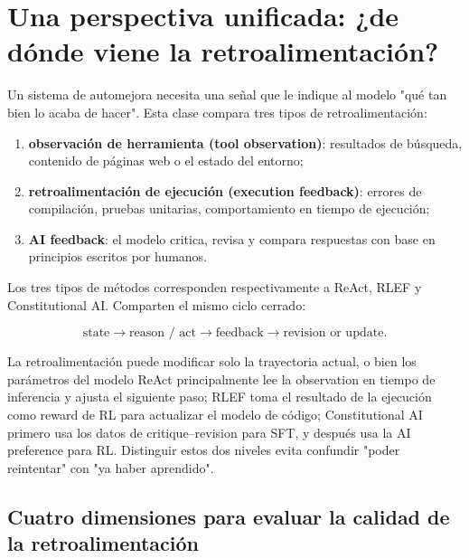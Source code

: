\documentclass[a4paper]{article}
\begin{document}
\makelecturetitle

\section{Una perspectiva unificada: ¿de dónde viene la retroalimentación?}

Un sistema de automejora necesita una señal que le indique al modelo "qué tan bien lo acaba de hacer". Esta clase compara tres tipos de retroalimentación:

\begin{enumerate}
    \item \textbf{observación de herramienta (tool observation)}: resultados de búsqueda, contenido de páginas web o el estado del entorno;
    \item \textbf{retroalimentación de ejecución (execution feedback)}: errores de compilación, pruebas unitarias, comportamiento en tiempo de ejecución;
    \item \textbf{AI feedback}: el modelo critica, revisa y compara respuestas con base en principios escritos por humanos.
\end{enumerate}


Los tres tipos de métodos corresponden respectivamente a ReAct, RLEF y Constitutional AI. Comparten el mismo ciclo cerrado:

$$
\text{state}\rightarrow\text{reason / act}\rightarrow\text{feedback}
\rightarrow\text{revision or update}.
$$

\begin{importantbox}{La retroalimentación puede modificar solo la trayectoria actual, o bien los parámetros del modelo}
ReAct principalmente lee la observation en tiempo de inferencia y ajusta el siguiente paso; RLEF toma el resultado de la ejecución como reward de RL para actualizar el modelo de código; Constitutional AI primero usa los datos de critique--revision para SFT, y después usa la AI preference para RL. Distinguir estos dos niveles evita confundir "poder reintentar" con "ya haber aprendido".
\end{importantbox}

\subsection{Cuatro dimensiones para evaluar la calidad de la retroalimentación}
\end{document}
